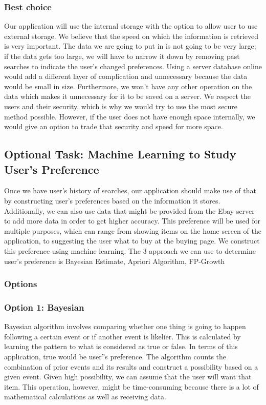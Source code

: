 \documentclass[journal,compsoc, 10pt, draftclsnofoot, onecolumn]{IEEEtran}
\begin{document}
\subsubsection{Best choice}
Our application will use the internal storage with the option to allow user to use
external storage. We believe that the speed on which the information is retrieved is
very important. The data we are going to put in is not going to be very large; if the
data gets too large, we will have to narrow it down by removing past searches to
indicate the user's changed preferences. Using a server database online would add a
different layer of complication and unnecessary because the data would be small in
size. Furthermore, we won't have any other operation on the data which makes it
unnecessary for it to be saved on a server. We respect the users and their security,
which is why we would try to use the most secure method possible. However, if the
user does not have enough space internally, we would give an option to trade that
security and speed for more space.

\subsection{Optional Task: Machine Learning to Study User's Preference}
Once we have user's history of searches, our application should make use of that by
constructing user's preferences based on the information it stores. Additionally, we
can also use data that might be provided from the Ebay server to add more data in
order to get higher accuracy. This preference will be used for multiple purposes,
which can range from showing items on the home screen of the application, to
suggesting the user what to buy at the buying page. We construct this preference
using machine learning.
The 3 approach we can use to determine user's preference is Bayesian Estimate,
Apriori Algorithm, FP-Growth

\subsubsection{Options}
\subsubsection*{Option 1: Bayesian}
Bayesian algorithm involves comparing whether one thing is going to happen following
a certain event or if another event is likelier. This is calculated by learning the
pattern to what is considered as true or false. In terms of this application, true
would be user''s preference. The algorithm counts the combination of prior events and
its results and construct a possibility based on a given event. Given high
possibility, we can assume that the user will want that item. This operation,
however, might be time-consuming because there is a lot of mathematical calculations
as well as receiving data.
\end{document}
